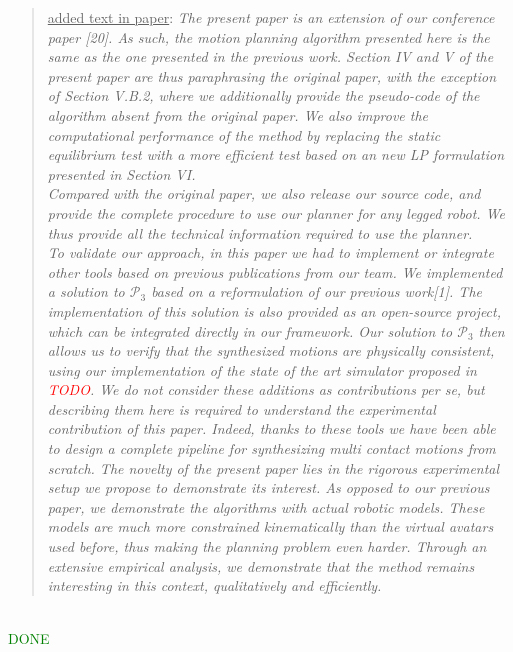 \documentclass[a4paper]{article}
\newcommand{\done}[0]{\textcolor{green}{DONE}}
\newcommand\as[1]{\begin{quote} \underline{answer}: {#1}\end{quote} }
\newcommand\qt[1]{\begin{quote} \underline{added text in paper}: \textit{#1}\end{quote} \leavevmode \\ }
\begin{document}
\qt{The present paper is an extension of our conference paper [20]. As such, the motion planning algorithm presented here is the same as the one presented in the
previous work. Section IV and V of the present paper are thus paraphrasing the original paper, with the exception of Section V.B.2, where we additionally provide the pseudo-code of the algorithm absent from the original paper. We also improve the computational performance of the method by replacing the static equilibrium test with a more efficient test based on an new LP formulation presented in Section VI. \\
Compared with the original paper, we also release our source code, and provide the complete procedure to use our planner for any legged robot. We thus provide
all the technical information required to use the planner. \\
To validate our approach, in this paper we had to implement or integrate other tools based on previous publications from our team. We implemented a solution to $\mathcal{P}_3$ based on a reformulation of our previous work[1]. The implementation of this solution is also provided as an open-source project, which can be integrated directly in our framework. Our solution to $\mathcal{P}_3$ then allows us to verify that the synthesized motions are physically consistent, using our implementation of the state of the art simulator proposed in \textcolor{red}{TODO}.
We do not consider these additions as contributions per se, but describing them here is required to understand the experimental contribution of this paper.
Indeed, thanks to these tools we have been able to design a complete pipeline for synthesizing multi contact motions from scratch.
The novelty of the present paper lies in the rigorous experimental setup we propose to demonstrate its interest.
As opposed to our previous paper, we demonstrate the algorithms with actual robotic models. These models are much more constrained kinematically than the virtual avatars used before,
thus making the planning problem even harder. Through an extensive empirical analysis, we demonstrate that the method remains interesting in this context, qualitatively and efficiently.}
\done

\end{document}
